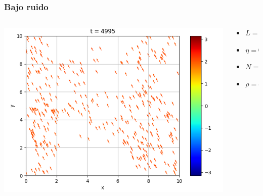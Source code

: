 \begin{frame}
\frametitle{Bajo ruido}

\begin{columns}
    \begin{column}{0.7\textwidth}
      \begin{center}
{}
{\includegraphics[width=0.7\linewidth]{animation/low_noise/plot_1000.png}}
\end{center}
    \end{column}
    \begin{column}{0.3\textwidth}
\begin{center}
            \footnotesize
        \begin{itemize}
        \item \(L = 10\)
        \item \(\eta = 0.1\)
        \item \(N = 400\)
        \item \(\rho = 4\)
        \end{itemize}
\end{center}
    \end{column}
\end{columns}
\end{frame}

